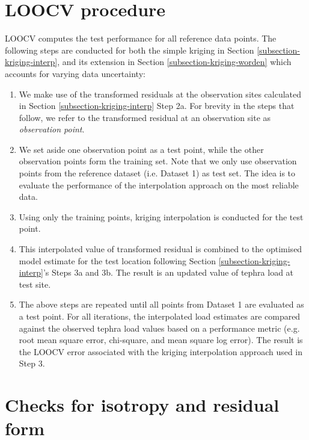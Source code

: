 \section{LOOCV procedure} \label{supp-loocv}


    LOOCV computes the test performance for all reference data points. The following steps are conducted for both the simple kriging in Section \ref{subsection-kriging-interp}, and its extension in Section \ref{subsection-kriging-worden} which accounts for varying data uncertainty: 
  
        \begin{enumerate}
  
        \item We make use of the transformed residuals at the observation sites calculated in Section \ref{subsection-kriging-interp} Step 2a. For brevity in the steps that follow, we refer to the transformed residual at an observation site as \textit{observation point}.
    
        \item We set aside one observation point as a test point, while the other observation points form the training set. Note that we only use observation points from the reference dataset (i.e. Dataset 1) as test set. The idea is to evaluate the performance of the interpolation approach on the most reliable data.
  
        \item Using only the training points, kriging interpolation is conducted for the test point.
    
        \item This interpolated value of transformed residual is combined to the optimised model estimate for the test location following Section \ref{subsection-kriging-interp}'s Steps 3a and 3b. The result is an updated value of tephra load at test site. 
    
        \item The above steps are repeated until all points from Dataset 1 are evaluated as a test point. For all iterations, the interpolated load estimates are compared against the observed tephra load values based on a performance metric (e.g. root mean square error, chi-square, and mean square log error). The result is the LOOCV error associated with the kriging interpolation approach used in Step 3.

        \end{enumerate}
  
  
\section{Checks for isotropy and residual form} \label{supp-isotrop}


